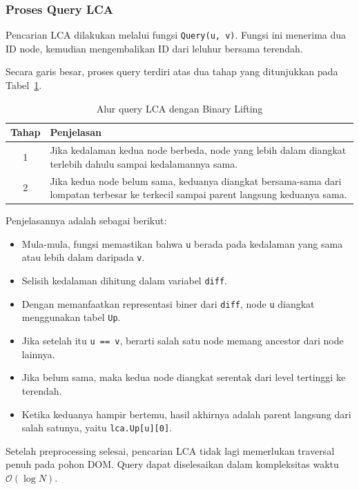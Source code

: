 \subsubsection{Proses Query LCA}

Pencarian LCA dilakukan melalui fungsi \texttt{Query(u, v)}. Fungsi ini menerima dua ID
node, kemudian mengembalikan ID dari leluhur bersama terendah.

Secara garis besar, proses query terdiri atas dua tahap yang ditunjukkan pada
Tabel~\ref{tab:alur-query-lca}.

\begin{table}[H]
\centering
\caption{Alur query LCA dengan Binary Lifting}
\label{tab:alur-query-lca}
\begin{tabular}{|c|p{10cm}|}
\hline
\textbf{Tahap} & \textbf{Penjelasan} \\ \hline
1 & Jika kedalaman kedua node berbeda, node yang lebih dalam diangkat terlebih dahulu sampai kedalamannya sama. \\ \hline
2 & Jika kedua node belum sama, keduanya diangkat bersama-sama dari lompatan terbesar ke terkecil sampai parent langsung keduanya sama. \\ \hline
\end{tabular}
\end{table}

Penjelasannya adalah sebagai berikut:
\begin{itemize}
    \item Mula-mula, fungsi memastikan bahwa \texttt{u} berada pada kedalaman yang sama atau lebih dalam daripada \texttt{v}.
    \item Selisih kedalaman dihitung dalam variabel \texttt{diff}.
    \item Dengan memanfaatkan representasi biner dari \texttt{diff}, node \texttt{u} diangkat menggunakan tabel \texttt{Up}.
    \item Jika setelah itu \texttt{u == v}, berarti salah satu node memang ancestor dari node lainnya.
    \item Jika belum sama, maka kedua node diangkat serentak dari level tertinggi ke terendah.
    \item Ketika keduanya hampir bertemu, hasil akhirnya adalah parent langsung dari salah satunya, yaitu \texttt{lca.Up[u][0]}.
\end{itemize}

\begin{tcolorbox}[colback=green!5,title=Keunggulan Query Ini]
Setelah preprocessing selesai, pencarian LCA tidak lagi memerlukan traversal penuh
pada pohon DOM. Query dapat diselesaikan dalam kompleksitas waktu
$\mathcal{O}(\log N)$.
\end{tcolorbox}

